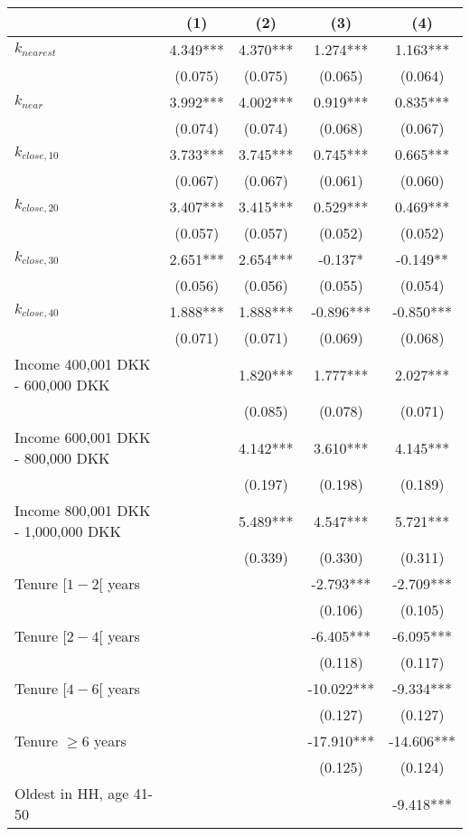 \begin{tabular}{lcccc}
\toprule
  & (1) & (2) & (3) & (4) \\ 
\midrule
$k_{nearest}$ & 4.349*** & 4.370*** & 1.274*** & 1.163*** \\ 
 & (0.075) & (0.075) & (0.065) & (0.064) \\ 
$k_{near}$ & 3.992*** & 4.002*** & 0.919*** & 0.835*** \\ 
 & (0.074) & (0.074) & (0.068) & (0.067) \\ 
$k_{close, 10}$ & 3.733*** & 3.745*** & 0.745*** & 0.665*** \\ 
 & (0.067) & (0.067) & (0.061) & (0.060) \\ 
$k_{close, 20}$ & 3.407*** & 3.415*** & 0.529*** & 0.469*** \\ 
 & (0.057) & (0.057) & (0.052) & (0.052) \\ 
$k_{close, 30}$ & 2.651*** & 2.654*** & -0.137* & -0.149** \\ 
 & (0.056) & (0.056) & (0.055) & (0.054) \\ 
$k_{close, 40}$ & 1.888*** & 1.888*** & -0.896*** & -0.850*** \\ 
 & (0.071) & (0.071) & (0.069) & (0.068) \\ 
Income 400,001 DKK - 600,000 DKK &  & 1.820*** & 1.777*** & 2.027*** \\ 
 &  & (0.085) & (0.078) & (0.071) \\ 
Income 600,001 DKK - 800,000 DKK &  & 4.142*** & 3.610*** & 4.145*** \\ 
 &  & (0.197) & (0.198) & (0.189) \\ 
Income 800,001 DKK - 1,000,000 DKK &  & 5.489*** & 4.547*** & 5.721*** \\ 
 &  & (0.339) & (0.330) & (0.311) \\ 
Tenure $[1-2[$ years &  &  & -2.793*** & -2.709*** \\ 
 &  &  & (0.106) & (0.105) \\ 
Tenure $[2-4[$ years &  &  & -6.405*** & -6.095*** \\ 
 &  &  & (0.118) & (0.117) \\ 
Tenure $[4-6[$ years &  &  & -10.022*** & -9.334*** \\ 
 &  &  & (0.127) & (0.127) \\ 
Tenure $\geq 6$ years &  &  & -17.910*** & -14.606*** \\ 
 &  &  & (0.125) & (0.124) \\ 
Oldest in HH, age 41-50 &  &  &  & -9.418*** \\ 

\end{tabular}
